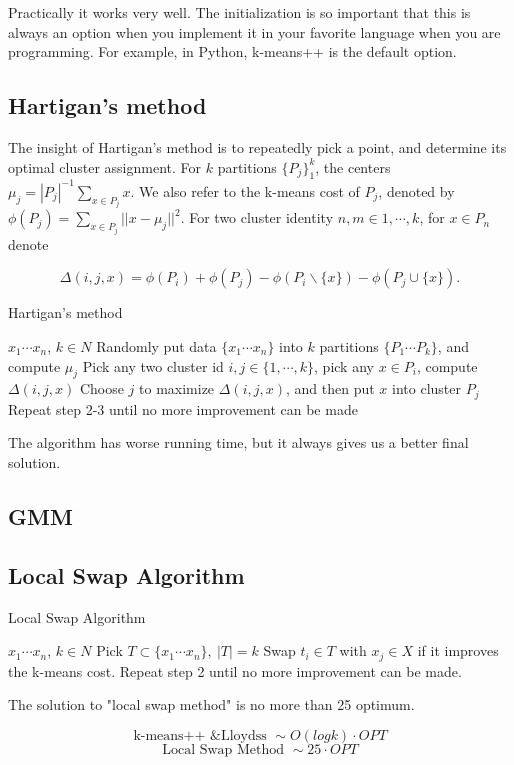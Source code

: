 Practically it works very well. The initialization is so important that this is always an option when you implement it in your favorite language when you are programming. For example, in Python, k-means++ is the default option. 
	
\subsection{Hartigan's method}

The insight of Hartigan's method is to repeatedly pick a point, and determine its optimal cluster assignment. For $k$ partitions $\{P_j\}_1^k$, the centers $\mu_j = |P_j|^{-1} \sum_{x \in P_j}x$. We also refer to the k-means cost of $P_j$, denoted by $\phi(P_j) = \sum_{x \in P_j} ||x-\mu_j||^2$. For two cluster identity $n, m \in {1,\cdots,k}$, for $x \in P_n$ denote

$$\Delta (i,j,x) = \phi(P_i) + \phi(P_j) - \phi(P_i \backslash \{x\}) - \phi(P_j \cup \{x\}).$$

\begin{algorithm}[H]
  \caption{Hartigan's method}
  \label{ladder-mechanism}
  \begin{algorithmic}[1]
    \renewcommand\algorithmicrequire{\textbf{input}} 
    \REQUIRE ${x_1\cdots x_n}$, $k\in N$
    \STATE Randomly put data $\{x_1\cdots x_n\}$ into $k$ partitions $\{P_1\cdots P_k\}$, and compute ${\mu_j}$
    \STATE Pick any two cluster id $i,j \in \{1,\cdots,k\}$, pick any $x \in P_i$, compute $\Delta(i,j,x)$
    \STATE Choose $j$ to maximize $\Delta(i,j,x)$, and then put $x$ into cluster $P_j$
    \STATE Repeat step 2-3 until no more improvement can be made
  \end{algorithmic}
\end{algorithm}

The algorithm has worse running time, but it always gives us a better final solution.

\subsection{GMM}

\subsection{Local Swap Algorithm}	
	
	
\begin{algorithm}[H]
  \caption{Local Swap Algorithm}
  \label{ladder-mechanism}
  \begin{algorithmic}[1]
    \renewcommand\algorithmicrequire{\textbf{input}} 
    \REQUIRE ${x_1\cdots x_n}$, $k\in N$   
    \STATE Pick $T\subset \{x_1\cdots x_n\},\ |T|=k$ 
    \STATE Swap $t_i\in T$ with $x_j\in X$ if it improves the k-means cost.
    \STATE Repeat step 2 until no more improvement can be made.
  \end{algorithmic}
\end{algorithm}

\begin{lemma}[w/o proof]
  The solution to "local swap method" is no more than 25 optimum.
\end{lemma}
$$\text{k-means++ \& Lloydss }\sim O(logk)\cdot OPT$$
$$\text{Local Swap Method }\sim 25\cdot OPT$$
	
